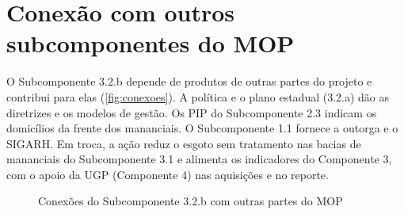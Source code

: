 \section{Conexão com outros subcomponentes do MOP}
\label{sec:conexoes}

O Subcomponente 3.2.b depende de produtos de outras partes do projeto e
contribui para elas (\autoref{fig:conexoes}). A política e o plano estadual
(3.2.a) dão as diretrizes e os modelos de gestão. Os PIP do Subcomponente 2.3
indicam os domicílios da frente dos mananciais. O Subcomponente 1.1 fornece a
outorga e o SIGARH. Em troca, a ação reduz o esgoto sem tratamento nas bacias
de mananciais do Subcomponente 3.1 e alimenta os indicadores do Componente 3,
com o apoio da UGP (Componente 4) nas aquisições e no reporte.

\begin{figure}[htbp]
  \centering
  \caption{Conexões do Subcomponente 3.2.b com outras partes do MOP}
  \label{fig:conexoes}
\end{figure}
